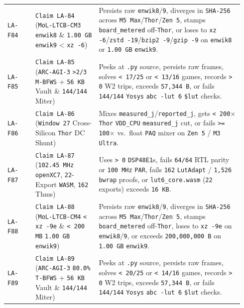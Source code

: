 \documentclass[10pt]{article}
\begin{document}
{\begin{longtable}{@{}L{0.11\linewidth}L{0.25\linewidth}L{0.58\linewidth}@{}}
\texttt{LA-F84} & \texttt{Claim LA-84} (\texttt{MoL-LTCB-CM3} \texttt{enwik8} \& \texttt{1.00 GB} \texttt{enwik9} < \texttt{xz -6}) & Persists raw \texttt{enwik8}/\texttt{9}, diverges in \texttt{SHA-256} across \texttt{M5 Max}/\texttt{Thor}/\texttt{Zen 5}, stamps \texttt{board\_metered} off-\texttt{Thor}, or loses to \texttt{xz -6}/\texttt{zstd -19}/\texttt{bzip2 -9}/\texttt{gzip -9} on \texttt{enwik8} or \texttt{1.00 GB} \texttt{enwik9}. \\
\texttt{LA-F85} & \texttt{Claim LA-85} (\texttt{ARC-AGI-3} \texttt{>2/3} \texttt{M-BFWS} + \texttt{56 KB} Vault \& \texttt{144/144} Miter) & Peeks at \texttt{.py} source, persists raw frames, solves \texttt{< 17/25} or \texttt{< 13/16} games, records \texttt{> 0} W2 trips, exceeds \texttt{57,344 B}, or fails \texttt{144/144} \texttt{Yosys} \texttt{abc -lut 6} \texttt{\$lut} checks. \\
\texttt{LA-F86} & \texttt{Claim LA-86} (\texttt{Window 27} Cross-Silicon \texttt{Thor} DC Shunt) & Mixes \texttt{measured\_j}/\texttt{reported\_j}, gets \texttt{< 200$\times$} \texttt{Thor} \texttt{VDD\_CPU} \texttt{measured\_j} cut, or fails \texttt{>= 100$\times$} vs.\ float \texttt{PAQ} mixer on \texttt{Zen 5} / \texttt{M3 Ultra}. \\
\texttt{LA-F87} & \texttt{Claim LA-87} (\texttt{102.45 MHz openXC7}, \texttt{22}-Export \texttt{WASM}, \texttt{162} Thms) & Uses \texttt{> 0} \texttt{DSP48E1}s, fails \texttt{64/64} RTL parity or \texttt{100 MHz} \texttt{PAR}, fails \texttt{162} \texttt{LutAdapt} / \texttt{1,526} \texttt{bwrap} proofs, or \texttt{lut6\_core.wasm} (\texttt{22} exports) exceeds \texttt{16 KB}. \\
\texttt{LA-F88} & \texttt{Claim LA-88} (\texttt{MoL-LTCB-CM4} \texttt{< xz -9e} \& \texttt{< 200 MB} \texttt{1.00 GB} \texttt{enwik9}) & Persists raw \texttt{enwik8}/\texttt{9}, diverges in \texttt{SHA-256} across \texttt{M5 Max}/\texttt{Thor}/\texttt{Zen 5}, stamps \texttt{board\_metered} off-\texttt{Thor}, loses to \texttt{xz -9e} on \texttt{enwik8}/\texttt{9}, or exceeds \texttt{200,000,000 B} on \texttt{1.00 GB} \texttt{enwik9}. \\
\texttt{LA-F89} & \texttt{Claim LA-89} (\texttt{ARC-AGI-3} \texttt{80.0\%} \texttt{T-BFWS} + \texttt{56 KB} Vault \& \texttt{144/144} Miter) & Peeks at \texttt{.py} source, persists raw frames, solves \texttt{< 20/25} or \texttt{< 14/16} games, records \texttt{> 0} W2 trips, exceeds \texttt{57,344 B}, or fails \texttt{144/144} \texttt{Yosys} \texttt{abc -lut 6} \texttt{\$lut} checks. \\

\end{longtable}}
\end{document}
